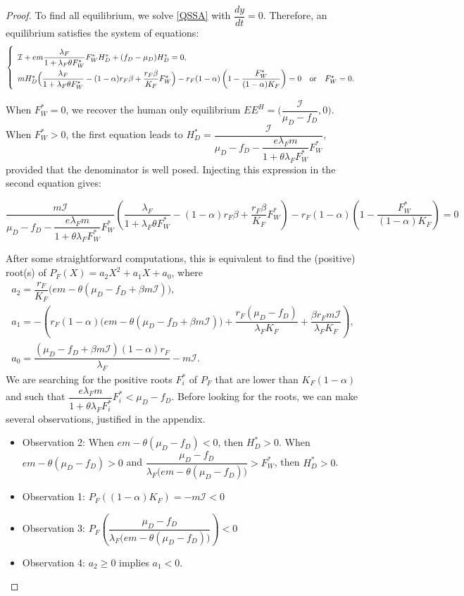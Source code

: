 \documentclass{article}
\newcommand{\lfw}{\lambda_{F}}
\newcommand{\lfw}{\lambda_{F}}
\newcommand{\cI}{\mathcal{I}}
\begin{document}
\begin{proof}
To find all equilibrium, we solve \eqref{QSSA} with $\dfrac{d y}{dt} = 0$. Therefore, an equilibrium satisfies the system of equations:
\begin{equation}\label{systemEquilibre}
\left\lbrace \begin{array}{lll}
\def\arraystretch{2}
\cI + e m \dfrac{\lfw}{1 + \lfw \theta F_W^*} F_W^* H_D^* + (f_D - \mu_D) H_D^* = 0,&&\\
m H_D^*\Big(\dfrac{\lfw}{1 + \lfw \theta F_W^*} - (1-\alpha)r_F \beta + \dfrac{r_F \beta}{K_F}F_W^* \Big) - r_F(1-\alpha) \left(1- \dfrac{F_W^*}{(1-\alpha)K_F}\right)= 0& \mbox{or} & F^*_W = 0.
\end{array} \right.
\end{equation}


When $F_W^* = 0$, we recover the human only equilibrium $EE^{H} = \Big(\dfrac{\cI}{\mu_D - f_D},0\Big)$. When $F_W^* > 0$, the first equation leads to $H_D^* = \dfrac{\cI}{\mu_D - f_D - \dfrac{e\lfw m }{1 + \theta \lfw F_W^*} F_W^*}$, provided that the denominator is well posed. Injecting this expression in the second equation gives:


\begin{equation*}
\dfrac{m\cI}{\mu_D - f_D - \dfrac{e\lfw m }{1 + \theta \lfw F_W^*} F_W^*}\left(\dfrac{\lfw}{1 + \lfw \theta F_W^*} - (1-\alpha)r_F \beta + \dfrac{r_F \beta}{K_F}F_W^* \right) - r_F(1-\alpha) \left(1- \dfrac{F_W^*}{(1-\alpha)K_F}\right)= 0 
\end{equation*}

After some straightforward computations, this is equivalent to find the (positive) root(s) of $P_F(X)=a_2X^2+a_1X+a_0$, where
$$
\begin{array}{l}
a_2=\dfrac{r_F}{K_F} \Big(em - \theta(\mu_D-f_D + \beta m \cI) \Big),\\ 
a_1=- \left(r_F (1-\alpha)   \Big(em - \theta(\mu_D-f_D + \beta m \cI)  \Big) + \dfrac{r_F(\mu_D-f_D)}{\lfw K_F} + \dfrac{\beta r_F m \cI}{\lfw K_F} \right),\\
a_0= \dfrac{(\mu_D - f_D + \beta m \cI)(1-\alpha) r_F}{\lfw} - m\cI .
\end{array}
$$
We are searching for the positive roots $F_i^*$ of $P_F$ that are lower than $K_F(1- \alpha)$ and such that $\dfrac{e\lfw m}{1 + \theta \lfw F_i^*} F_i^* < \mu_D - f_D$. Before looking for the roots, we can make several observations, justified in the appendix.

\begin{itemize}
\item Observation 2: When $e m - \theta (\mu_D - f_D) < 0$, then $H_D^* > 0$. When $e m - \theta (\mu_D - f_D) > 0$ and $\dfrac{\mu_D - f_D}{\lfw \Big(e m - \theta (\mu_D - f_D)\Big)} > F_W^*$, then $H_D^* > 0$.
\item Observation 1: $P_F((1-\alpha)K_F) = - m \cI < 0$
\item Observation 3: $P_F\left(\dfrac{\mu_D - f_D}{\lfw \Big(e m - \theta (\mu_D - f_D)\Big)} \right) < 0$
\item Observation 4: $a_2 \geq 0$ implies $a_1 < 0$.
\end{itemize}


\end{proof}
\end{document}

